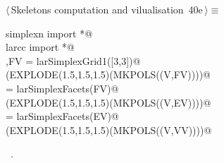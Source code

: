 \documentclass[11pt,oneside]{article}	%
\begin{document}
\begin{flushleft} \small \label{scrap84}
\protect{}$\langle\,$Skeletons computation and vilualisation\nobreak\ {\footnotesize 40e}$\,\rangle\equiv$
\vspace{-1ex}
\begin{list}{}{} \item
\mbox{}\verb@from simplexn import *@\\
\mbox{}\verb@from larcc import *@\\
\mbox{}\verb@V,FV = larSimplexGrid1([3,3])@\\
\mbox{}\verb@VIEW(EXPLODE(1.5,1.5,1.5)(MKPOLS((V,FV))))@\\
\mbox{}\verb@EV = larSimplexFacets(FV)@\\
\mbox{}\verb@VIEW(EXPLODE(1.5,1.5,1.5)(MKPOLS((V,EV))))@\\
\mbox{}\verb@VV = larSimplexFacets(EV)@\\
\mbox{}\verb@VIEW(EXPLODE(1.5,1.5,1.5)(MKPOLS((V,VV))))@\\
\mbox{}\verb@@{\NWsep}
\end{list}
\vspace{-1ex}
\footnotesize\addtolength{\baselineskip}{-1ex}
\begin{list}{}{\setlength{\itemsep}{-\parsep}\setlength{\itemindent}{-\leftmargin}}
\item \NWtxtMacroRefIn\ .
\end{list}
\end{flushleft}
\end{document}
